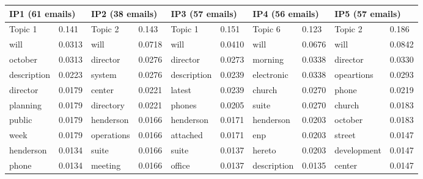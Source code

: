 \documentclass[a4paper]{article}
\begin{document}
\begin{table}[ht]
		\centering
\begin{tabular}{|l|l||l|l||l|l||l|l||l|l|}
	\hline
	\multicolumn{2}{|l||}{\textbf{IP1} (61 emails)}&\multicolumn{2}{l||}{\textbf{IP2} (38 emails)}&\multicolumn{2}{l||}{\textbf{IP3} (57 emails)}&\multicolumn{2}{l||}{\textbf{IP4} (56 emails)}&\multicolumn{2}{l|}{\textbf{IP5} (57 emails)}\\
	\hline\hline
	Topic 1&0.141&Topic 2&0.143&Topic 1 &0.151 & Topic 6 & 0.123 & Topic 2& 0.186 \\
	\hline
\scriptsize will&\scriptsize 0.0313&\scriptsize will&\scriptsize 0.0718&\scriptsize will&\scriptsize 0.0410&\scriptsize will&\scriptsize 0.0676&\scriptsize will&\scriptsize 0.0842\\
\scriptsize october&\scriptsize 0.0313&\scriptsize director&\scriptsize  0.0276&\scriptsize director&\scriptsize 0.0273&\scriptsize morning&\scriptsize 0.0338&\scriptsize director&\scriptsize 0.0330\\
\scriptsize description&\scriptsize  0.0223&\scriptsize system&\scriptsize 0.0276&\scriptsize description&\scriptsize 0.0239&\scriptsize electronic&\scriptsize 0.0338&\scriptsize opeartions&\scriptsize 0.0293\\
\scriptsize director&\scriptsize 0.0179&\scriptsize center&\scriptsize 0.0221&\scriptsize latest&\scriptsize 0.0239&\scriptsize church&\scriptsize 0.0270&\scriptsize phone&\scriptsize 0.0219\\
\scriptsize planning&\scriptsize 0.0179&\scriptsize directory&\scriptsize  0.0221&\scriptsize phones&\scriptsize 0.0205&\scriptsize suite&\scriptsize 0.0270&\scriptsize church&\scriptsize 0.0183\\
\scriptsize public&\scriptsize 0.0179&\scriptsize henderson&\scriptsize 0.0166&\scriptsize henderson&\scriptsize 0.0171&\scriptsize henderson&\scriptsize 0.0203&\scriptsize october&\scriptsize 0.0183\\
\scriptsize week&\scriptsize 0.0179&\scriptsize operations&\scriptsize 0.0166&\scriptsize attached&\scriptsize  0.0171&\scriptsize enp&\scriptsize 0.0203&\scriptsize street&\scriptsize 0.0147\\
\scriptsize henderson&\scriptsize 0.0134&\scriptsize suite&\scriptsize 0.0166&\scriptsize suite&\scriptsize 0.0137&\scriptsize hereto&\scriptsize  0.0203&\scriptsize development&\scriptsize  0.0147\\
\scriptsize phone&\scriptsize 0.0134&\scriptsize meeting&\scriptsize 0.0166&\scriptsize office&\scriptsize 0.0137&\scriptsize description&\scriptsize 0.0135&\scriptsize center&\scriptsize  0.0147\\

\end{tabular}
\end{table}
\end{document}

